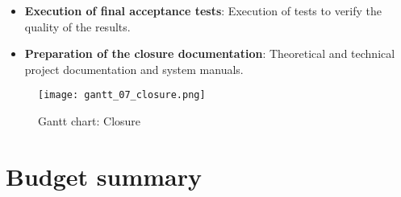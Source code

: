 \begin{itemize}
    \item \textbf{Execution of final acceptance tests}: Execution of tests to verify the quality of the results.
    \item \textbf{Preparation of the closure documentation}: Theoretical and technical project documentation and system manuals.
\end{itemize}

\begin{figure}[H]
    \caption{Gantt chart: Closure}
  \centering
  \texttt{[image: gantt\_07\_closure.png]}
\end{figure}



\section{Budget summary}

